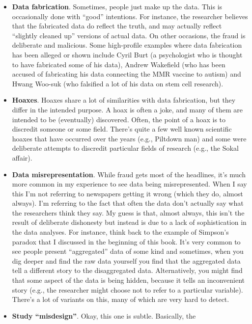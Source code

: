 \documentclass[
  a4paper,
]{book}
\providecommand{\tightlist}{%
  \setlength{\itemsep}{0pt}\setlength{\parskip}{0pt}}\usepackage{longtable,booktabs,array}
\begin{document}
\begin{itemize}
\tightlist
\item
  \textbf{Data fabrication}. Sometimes, people just make up the data.
  This is occasionally done with ``good'' intentions. For instance, the
  researcher believes that the fabricated data do reflect the truth, and
  may actually reflect ``slightly cleaned up'' versions of actual data.
  On other occasions, the fraud is deliberate and malicious. Some
  high-profile examples where data fabrication has been alleged or shown
  include Cyril Burt (a psychologist who is thought to have fabricated
  some of his data), Andrew Wakefield (who has been accused of
  fabricating his data connecting the MMR vaccine to autism) and Hwang
  Woo-suk (who falsified a lot of his data on stem cell research).
\item
  \textbf{Hoaxes}. Hoaxes share a lot of similarities with data
  fabrication, but they differ in the intended purpose. A hoax is often
  a joke, and many of them are intended to be (eventually) discovered.
  Often, the point of a hoax is to discredit someone or some field.
  There's quite a few well known scientific hoaxes that have occurred
  over the years (e.g., Piltdown man) and some were deliberate attempts
  to discredit particular fields of research (e.g., the Sokal affair).
\item
  \textbf{Data misrepresentation}. While fraud gets most of the
  headlines, it's much more common in my experience to see data being
  misrepresented. When I say this I'm not referring to newspapers
  getting it wrong (which they do, almost always). I'm referring to the
  fact that often the data don't actually say what the researchers think
  they say. My guess is that, almost always, this isn't the result of
  deliberate dishonesty but instead is due to a lack of sophistication
  in the data analyses. For instance, think back to the example of
  Simpson's paradox that I discussed in the beginning of this book. It's
  very common to see people present ``aggregated'' data of some kind and
  sometimes, when you dig deeper and find the raw data yourself you find
  that the aggregated data tell a different story to the disaggregated
  data. Alternatively, you might find that some aspect of the data is
  being hidden, because it tells an inconvenient story (e.g., the
  researcher might choose not to refer to a particular variable).
  There's a lot of variants on this, many of which are very hard to
  detect.
\item
  \textbf{Study ``misdesign''}. Okay, this one is subtle. Basically, the

\end{itemize}
\end{document}
